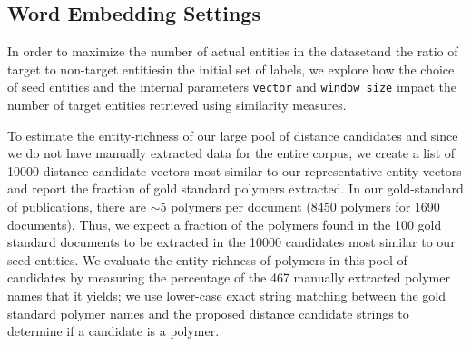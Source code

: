 \subsection{Word Embedding Settings}
In order to maximize the number of actual entities in the dataset\textemdash and the ratio of target to non-target entities\textemdash in the initial set of labels,
we explore how the choice of seed entities and the internal parameters \texttt{vector} and \texttt{window_size} impact the number of target entities retrieved using similarity measures.


To estimate the entity-richness of our large pool of distance candidates and since we do not have manually extracted data for the entire corpus, we create a list of \num{10000} distance candidate vectors most similar to our representative entity vectors and report the fraction of gold standard polymers extracted. 
In our gold-standard of publications, there are $\sim$5 polymers per document (\num{8450} polymers for \num{1690} documents). Thus, we expect a fraction of the polymers found in the 100 gold standard documents to be extracted in the \num{10000} candidates most similar to our seed entities.
We evaluate the entity-richness of polymers in this pool of candidates by measuring the percentage of the 467 manually extracted polymer names that it yields;
we use lower-case exact string matching between the gold standard polymer names and the proposed distance candidate strings to determine if a candidate is a polymer.

